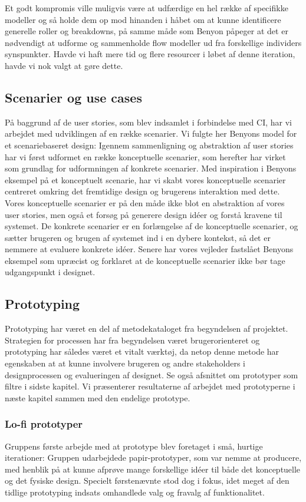 Et godt kompromis ville muligvis være at udfærdige en hel række af specifikke modeller og så holde dem op mod hinanden i håbet om at kunne identificere generelle roller og breakdowns, på samme måde som Benyon påpeger at det er nødvendigt at udforme og sammenholde flow modeller ud fra forskellige individers synspunkter. Havde vi haft mere tid og flere resourcer i løbet af denne iteration, havde vi nok valgt at gøre dette.

\subsection{Scenarier og use cases}
På baggrund af de user stories, som blev indsamlet i forbindelse med CI, har vi arbejdet med udviklingen af en række scenarier. Vi fulgte her Benyons model for et scenariebaseret design: Igennem sammenligning og abstraktion af user stories har vi først udformet en række konceptuelle scenarier, som herefter har virket som grundlag for udformningen af konkrete scenarier.
Med inspiration i Benyons eksempel på et konceptuelt scenarie, har vi skabt vores konceptuelle scenarier centreret omkring det fremtidige design og brugerens interaktion med dette. Vores konceptuelle scenarier er på den måde ikke blot en abstraktion af vores user stories, men også et forsøg på generere design idéer og forstå kravene til systemet. De konkrete scenarier er en forlængelse af de konceptuelle scenarier, og sætter brugeren og brugen af systemet ind i en dybere kontekst, så det er nemmere at evaluere konkrete idéer. 
Senere har vores vejleder fastslået Benyons eksempel som upræcist og forklaret at de konceptuelle scenarier ikke bør tage udgangspunkt i designet. 

\subsection{Prototyping}
Prototyping har været en del af metodekataloget fra begyndelsen af projektet. Strategien for processen har fra begyndelsen været brugerorienteret og prototyping har således været et vitalt værktøj, da netop denne metode har egenskaben at at kunne involvere brugeren og andre stakeholders i designprocessen og evalueringen af designet. Se også afsnittet om prototyper som filtre i sidste kapitel. Vi præsenterer resultaterne af arbejdet med prototyperne i næste kapitel sammen med den endelige prototype.

\subsubsection{Lo-fi prototyper}
Gruppens første arbejde med at prototype blev foretaget i små, hurtige iterationer: Gruppen udarbejdede papir-prototyper, som var nemme at producere, med henblik på at kunne afprøve mange forskellige idéer til både det konceptuelle og det fysiske design. Specielt førstenævnte stod dog i fokus, idet meget af den tidlige prototyping indsats omhandlede valg og fravalg af funktionalitet.

